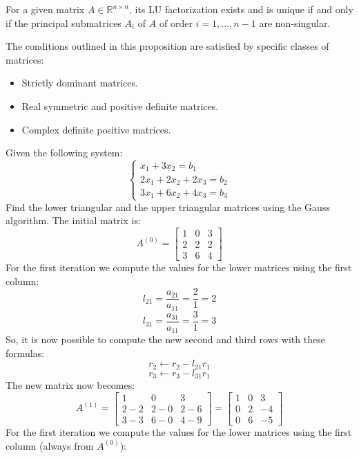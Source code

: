\begin{proposition}
    For a given matrix $A \in \mathbb{R}^{n \times n}$, its LU factorization exists and is unique if and only if the principal submatrices $A_i$ of $A$ of order $i=1,\dots,n-1$ are non-singular. 
\end{proposition}
The conditions outlined in this proposition are satisfied by specific classes of matrices:
\begin{itemize}
    \item Strictly dominant matrices. 
    \item Real symmetric and positive definite matrices. 
    \item Complex definite positive matrices. 
\end{itemize}
\begin{example}
    Given the following system: 
    \[  \begin{cases}
            x_1+3x_2=b_1 \\
            2x_1+2x_2+2x_3=b_2 \\
            3x_1+6x_2+4x_3=b_3
        \end{cases}\]
    Find the lower triangular and the upper triangular matrices using the Gauss algorithm. The initial matrix is: 
    \[A^{(0)}=            
        \begin{bmatrix}
            1 & 0 & 3 \\
            2 & 2 & 2 \\
            3 & 6 & 4
        \end{bmatrix}\]
    For the first iteration we compute the values for the lower matrices using the first column: 
    \[l_{21}=\dfrac{a_{21}}{a_{11}}=\dfrac{2}{1}=2\]
    \[l_{31}=\dfrac{a_{31}}{a_{11}}=\dfrac{3}{1}=3\]
    So, it is now possible to compute the new second and third rows with these formulas: 
    \[r_2 \leftarrow r_2 - l_{21}r_1\]
    \[r_3 \leftarrow r_3 - l_{31}r_1\]
    The new matrix now becomes: 
    \[A^{(1)}=            
    \begin{bmatrix}
        1 & 0 & 3 \\
        2-2 & 2-0 & 2-6 \\
        3-3 & 6-0 & 4-9
    \end{bmatrix} =
    \begin{bmatrix}
        1 & 0 & 3 \\
        0 & 2 & -4 \\
        0 & 6 & -5
    \end{bmatrix}\]
    For the first iteration we compute the values for the lower matrices using the first column (always from $A^{(0)}$): 

\end{example}
